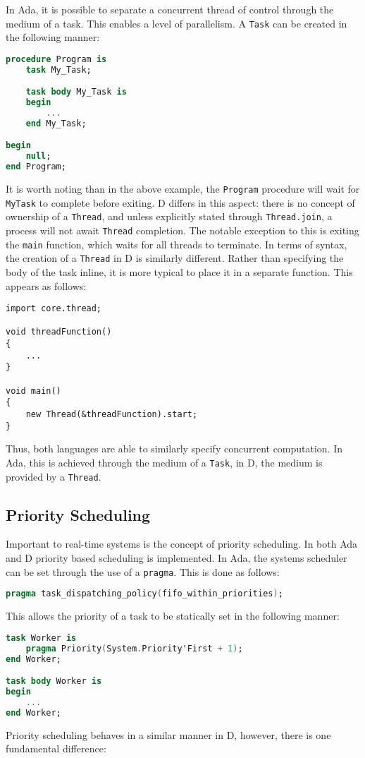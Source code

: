 In Ada, it is possible to separate a concurrent thread of control through the
medium of a task. This enables a level of parallelism. A \texttt{Task} can be 
created in the following manner: 
\begin{lstlisting}[language=Ada]
procedure Program is 
    task My_Task; 

    task body My_Task is 
    begin
        ...
    end My_Task;

begin
    null; 
end Program;
\end{lstlisting}
It is worth noting than in the above example, the \texttt{Program} procedure will wait
for \texttt{My\textunderscore{}Task} to complete before exiting. D differs in this aspect: 
there is no concept of ownership of a \texttt{Thread}, and unless
explicitly stated through \texttt{Thread.join}, a process will not await
\texttt{Thread} completion. The notable exception to this is exiting the
\texttt{main} function, which waits for all threads to terminate. 
In terms of syntax, the creation of a
\texttt{Thread} in D is similarly different. Rather than specifying the body of
the task inline, it is more typical to place it in a separate function. This
appears as follows: 
\begin{lstlisting}
import core.thread; 

void threadFunction()
{
    ...
}

void main()
{
    new Thread(&threadFunction).start;
}
\end{lstlisting}
Thus, both languages are able to similarly specify concurrent computation. In
Ada, this is achieved through the medium of a \texttt{Task}, in D, the medium
is provided by a \texttt{Thread}. 

\subsection{Priority Scheduling}
Important to real-time systems is the concept of priority scheduling. In both
Ada and D priority based scheduling is implemented. In Ada, the systems scheduler can
be set through the use of a \texttt{pragma}. This is done as follows: 
\begin{lstlisting}[language=Ada]
pragma task_dispatching_policy(fifo_within_priorities); 
\end{lstlisting}
This allows the priority of a task to be statically set in the following manner: 
\begin{lstlisting}[language=Ada]
task Worker is 
    pragma Priority(System.Priority'First + 1); 
end Worker;

task body Worker is 
begin 
    ...
end Worker; 
\end{lstlisting}
Priority scheduling behaves in a similar manner in D, however, there is one
fundamental difference: 

